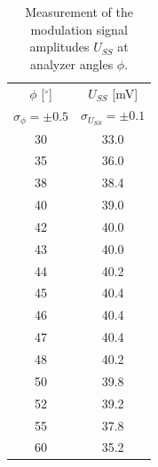 \documentclass[a4paper]{article}
\begin{document}
\begin{table}[H]
  \centering
  \begin{tabular}{c c}
    \toprule
    {$\phi$ [$^\circ$]} & {$U_{SS}$ [mV]} \\
    $\sigma_{\phi} = \pm 0.5$ & $\sigma_{U_{SS}} = \pm 0.1$ \\
    \midrule
    30 & 33.0 \\
    35 & 36.0 \\
    38 & 38.4 \\
    40 & 39.0 \\
    42 & 40.0 \\
    43 & 40.0 \\
    44 & 40.2 \\
    45 & 40.4 \\
    46 & 40.4 \\
    47 & 40.4 \\
    48 & 40.2 \\
    50 & 39.8 \\
    52 & 39.2 \\
    55 & 37.8 \\
    60 & 35.2 \\
    \bottomrule
  \end{tabular}
  \caption{Measurement of the modulation signal amplitudes $U_{SS}$ at analyzer angles $\phi$.}\label{tab:modulation_data}
\end{table}
\end{document}
